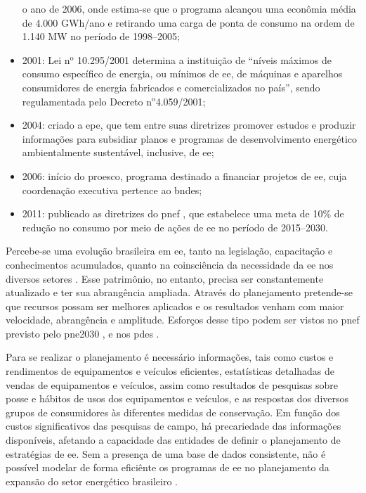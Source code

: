 \begin{itemize}
o ano de 2006, onde estima-se que o programa alcançou uma econômia média de 
4.000 GWh/ano e retirando uma carga de ponta de consumo na ordem de 1.140 MW no período de 1998--2005;
\item 2001: Lei n$^\text{o}$ 10.295/2001 determina a instituição de ``níveis
máximos de consumo específico de energia, ou mínimos de \gls{ee},
de máquinas e aparelhos consumidores de energia fabricados e comercializados no
país'', sendo regulamentada pelo Decreto n$^\text{o}$4.059/2001;
\item 2004: criado a \gls{epe}, que tem entre suas diretrizes promover estudos e
produzir informações para subsidiar planos e programas de desenvolvimento
energético ambientalmente sustentável, inclusive, de \gls{ee};
\item 2006: início do \gls{proesco}, programa destinado a financiar projetos de
\gls{ee}, cuja coordenação executiva pertence ao \gls{bndes};
\item 2011: publicado as diretrizes do \gls{pnef} \cite{pnef}, que estabelece uma meta de
10\% de redução no consumo por meio de ações de \gls{ee} no período 
de 2015--2030.
\end{itemize}

Percebe-se uma evolução brasileira em \gls{ee}, tanto na legislação, 
capacitação e conhecimentos acumulados, quanto na 
coinsciência da necessidade da \gls{ee} nos diversos setores \cite{pnef}. 
Esse patrimônio, no entanto, precisa ser constantemente atualizado 
e ter sua abrangência ampliada. Através do planejamento pretende-se que
recursos possam ser melhores aplicados e os resultados venham com maior
velocidade, abrangência e amplitude. Esforços desse tipo podem ser vistos no
\gls{pnef} \cite{pnef} previsto pelo \gls{pne2030} \cite{pne30_eff_energ}, e nos
\glspl{pde} \cite{pde_2012}.

Para se realizar o planejamento é necessário informações, tais como custos e
rendimentos de equipamentos e veículos eficientes, estatísticas detalhadas de
vendas de equipamentos e veículos, assim como resultados de pesquisas sobre
posse e hábitos de usos dos equipamentos e veículos, e as respostas dos diversos
grupos de consumidores às diferentes medidas de conservação. Em função dos
custos significativos das pesquisas de campo, há precariedade das informações
disponíveis, afetando a capacidade das entidades de definir o planejamento de
estratégias de \gls{ee}. Sem a presença de uma base de dados consistente, 
não é possível modelar de forma eficiênte os programas de \gls{ee} no
planejamento da expansão do setor energético brasileiro \cite{pne30_eff_energ}. 

